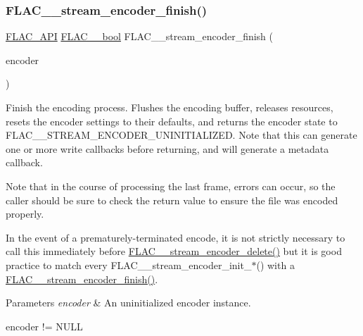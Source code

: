 \subsubsection{\texorpdfstring{F\+L\+A\+C\+\_\+\+\_\+stream\+\_\+encoder\+\_\+finish()}{FLAC\_\_stream\_encoder\_finish()}}
{\footnotesize\ttfamily \hyperlink{group__flac__export_ga56ca07df8a23310707732b1c0007d6f5}{F\+L\+A\+C\+\_\+\+A\+PI} \hyperlink{ordinals_8h_a95103469f1cbd78b8cf250194985b34e}{F\+L\+A\+C\+\_\+\+\_\+bool} F\+L\+A\+C\+\_\+\+\_\+stream\+\_\+encoder\+\_\+finish (\begin{DoxyParamCaption}\item[{\hyperlink{struct_f_l_a_c_____stream_encoder}{F\+L\+A\+C\+\_\+\+\_\+\+Stream\+Encoder} $\ast$}]{encoder }\end{DoxyParamCaption})}

Finish the encoding process. Flushes the encoding buffer, releases resources, resets the encoder settings to their defaults, and returns the encoder state to F\+L\+A\+C\+\_\+\+\_\+\+S\+T\+R\+E\+A\+M\+\_\+\+E\+N\+C\+O\+D\+E\+R\+\_\+\+U\+N\+I\+N\+I\+T\+I\+A\+L\+I\+Z\+ED. Note that this can generate one or more write callbacks before returning, and will generate a metadata callback.

Note that in the course of processing the last frame, errors can occur, so the caller should be sure to check the return value to ensure the file was encoded properly.

In the event of a prematurely-\/terminated encode, it is not strictly necessary to call this immediately before \hyperlink{group__flac__stream__encoder_ga9c9956af42bebe923da59437628aa9ea}{F\+L\+A\+C\+\_\+\+\_\+stream\+\_\+encoder\+\_\+delete()} but it is good practice to match every F\+L\+A\+C\+\_\+\+\_\+stream\+\_\+encoder\+\_\+init\+\_\+$\ast$() with a \hyperlink{group__flac__stream__encoder_gab2c1e5477c1e3fe9ad0d722ff8eecda2}{F\+L\+A\+C\+\_\+\+\_\+stream\+\_\+encoder\+\_\+finish()}.


\begin{DoxyParams}{Parameters}
{\em encoder} & An uninitialized encoder instance.  
\begin{DoxyCode}
encoder != NULL 
\end{DoxyCode}
 \\
\hline
\end{DoxyParams}

